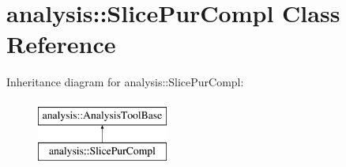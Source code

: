 \hypertarget{classanalysis_1_1SlicePurCompl}{}\section{analysis\+:\+:Slice\+Pur\+Compl Class Reference}
\label{classanalysis_1_1SlicePurCompl}
Inheritance diagram for analysis\+:\+:Slice\+Pur\+Compl\+:\begin{figure}[H]
\begin{center}
\leavevmode
\includegraphics[height=2.000000cm]{classanalysis_1_1SlicePurCompl}
\end{center}
\end{figure}
